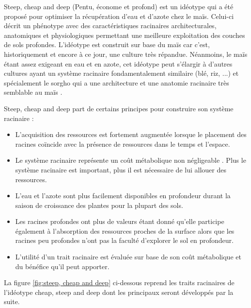 Steep, cheap and deep (Pentu, économe et profond) est un idéotype qui a été proposé pour optimiser la récupération d'eau et d'azote chez le maïs. 
Celui-ci décrit un phénotype avec des caractéristiques racinaires architecturales, anatomiques et physiologiques permettant une meilleure exploitation des couches de sols profondes.
L'idéotype est construit sur base du maïs car c'est, historiquement et encore à ce jour, une culture très répandue. 
Néanmoins, le maïs étant assez exigeant en eau et en azote, cet idéotype peut s'élargir à d'autres cultures ayant un système racinaire fondamentalement similaire (blé, riz, ...) et spécialement le sorgho qui a une architecture et une anatomie racinaire très semblable au maïs \citep{lynch_steep_2013}.
\newline

Steep, cheap and deep part de certains principes pour construire son système racinaire :

\begin{itemize}
    \item L'acquisition des ressources est fortement augmentée lorsque le placement des racines coïncide avec la présence de ressources dans le temps et l'espace.
    \item Le système racinaire représente un coût métabolique non négligeable \citep{kafkafi_respiratory_2002}. Plus le système racinaire est important, plus il est nécessaire de lui allouer des ressources.
    \item L'eau et l'azote sont plus facilement disponibles en profondeur durant la saison de croissance des plantes pour la plupart des sols.
    \item Les racines profondes ont plus de valeurs étant donné qu'elle participe également à l'absorption des ressources proches de la surface alors que les racines peu profondes n'ont pas la faculté d'explorer le sol en profondeur.
    \item L'utilité d'un trait racinaire est évaluée sur base de son coût métabolique et du bénéfice qu'il peut apporter.
\end{itemize}

La figure \ref{fig:steep, cheap and deep} ci-dessous reprend les traits racinaires de l'idéotype cheap, steep and deep dont les principaux seront développés par la suite.

